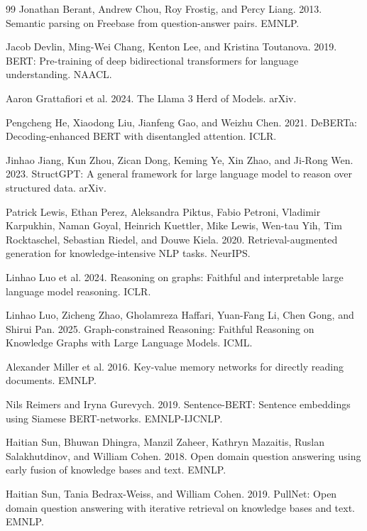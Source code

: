 \documentclass[10pt,twocolumn]{article}
\begin{document}
\begin{thebibliography}{99}
Jonathan Berant, Andrew Chou, Roy Frostig, and Percy Liang. 2013.
Semantic parsing on Freebase from question-answer pairs. EMNLP.

Jacob Devlin, Ming-Wei Chang, Kenton Lee, and Kristina Toutanova. 2019.
BERT: Pre-training of deep bidirectional transformers for language understanding. NAACL.

Aaron Grattafiori et al. 2024.
The Llama 3 Herd of Models. arXiv.

Pengcheng He, Xiaodong Liu, Jianfeng Gao, and Weizhu Chen. 2021.
DeBERTa: Decoding-enhanced BERT with disentangled attention. ICLR.

Jinhao Jiang, Kun Zhou, Zican Dong, Keming Ye, Xin Zhao, and Ji-Rong Wen. 2023.
StructGPT: A general framework for large language model to reason over structured data. arXiv.

Patrick Lewis, Ethan Perez, Aleksandra Piktus, Fabio Petroni, Vladimir Karpukhin, Naman Goyal, Heinrich Kuettler, Mike Lewis, Wen-tau Yih, Tim Rocktaschel, Sebastian Riedel, and Douwe Kiela. 2020.
Retrieval-augmented generation for knowledge-intensive NLP tasks. NeurIPS.

Linhao Luo et al. 2024.
Reasoning on graphs: Faithful and interpretable large language model reasoning. ICLR.

Linhao Luo, Zicheng Zhao, Gholamreza Haffari, Yuan-Fang Li, Chen Gong, and Shirui Pan. 2025.
Graph-constrained Reasoning: Faithful Reasoning on Knowledge Graphs with Large Language Models. ICML.

Alexander Miller et al. 2016.
Key-value memory networks for directly reading documents. EMNLP.

Nils Reimers and Iryna Gurevych. 2019.
Sentence-BERT: Sentence embeddings using Siamese BERT-networks. EMNLP-IJCNLP.

Haitian Sun, Bhuwan Dhingra, Manzil Zaheer, Kathryn Mazaitis, Ruslan Salakhutdinov, and William Cohen. 2018.
Open domain question answering using early fusion of knowledge bases and text. EMNLP.

Haitian Sun, Tania Bedrax-Weiss, and William Cohen. 2019.
PullNet: Open domain question answering with iterative retrieval on knowledge bases and text. EMNLP.


\end{thebibliography}
\end{document}
